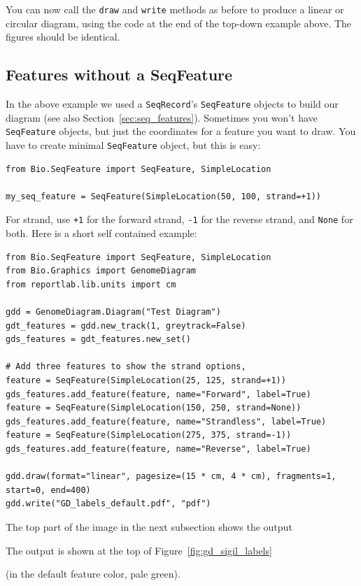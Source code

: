 You can now call the \verb|draw| and \verb|write| methods as before to produce
a linear or circular diagram, using the code at the end of the top-down example
above.  The figures should be identical.

\subsection{Features without a SeqFeature}
\label{sec:gd_features_without_seqfeatures}

In the above example we used a \verb|SeqRecord|'s \verb|SeqFeature| objects
to build our diagram (see also Section~\ref{sec:seq_features}).
Sometimes you won't have \verb|SeqFeature| objects,
but just the coordinates for a feature you want to draw.  You have to create
minimal \verb|SeqFeature| object, but this is easy:

\begin{verbatim}
from Bio.SeqFeature import SeqFeature, SimpleLocation

my_seq_feature = SeqFeature(SimpleLocation(50, 100, strand=+1))
\end{verbatim}

For strand, use \texttt{+1} for the forward strand, \texttt{-1} for the
reverse strand, and \texttt{None} for both.  Here is a short self contained
example:

\begin{verbatim}
from Bio.SeqFeature import SeqFeature, SimpleLocation
from Bio.Graphics import GenomeDiagram
from reportlab.lib.units import cm

gdd = GenomeDiagram.Diagram("Test Diagram")
gdt_features = gdd.new_track(1, greytrack=False)
gds_features = gdt_features.new_set()

# Add three features to show the strand options,
feature = SeqFeature(SimpleLocation(25, 125, strand=+1))
gds_features.add_feature(feature, name="Forward", label=True)
feature = SeqFeature(SimpleLocation(150, 250, strand=None))
gds_features.add_feature(feature, name="Strandless", label=True)
feature = SeqFeature(SimpleLocation(275, 375, strand=-1))
gds_features.add_feature(feature, name="Reverse", label=True)

gdd.draw(format="linear", pagesize=(15 * cm, 4 * cm), fragments=1, start=0, end=400)
gdd.write("GD_labels_default.pdf", "pdf")
\end{verbatim}

\begin{htmlonly}
The top part of the image in the next subsection shows the output
\end{htmlonly}
\begin{latexonly}
The output is shown at the top of Figure~\ref{fig:gd_sigil_labels}
\end{latexonly}
(in the default feature color, pale green).

